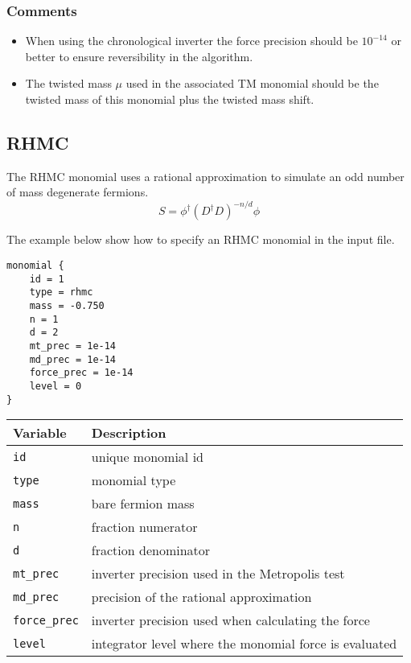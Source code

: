 \documentclass[12pt]{article}
\begin{document}
\subsubsection*{Comments}
\begin{itemize}
 \item When using the chronological inverter the force precision should be $10^{-14}$ or better to ensure reversibility in the algorithm.
 \item The twisted mass $\mu$ used in the associated TM monomial should be the twisted mass of this monomial plus the twisted mass shift.
\end{itemize}

\newpage
\subsection*{RHMC}
The RHMC monomial uses a rational approximation to simulate an odd number of mass degenerate fermions.
\begin{equation}
 S = \phi^\dagger(D^\dagger D)^{-n/d}\phi
\end{equation}

The example below show how to specify an RHMC monomial in the input file.
\begin{center}
\begin{minipage}{55mm}
\begin{framed}
\begin{verbatim}
monomial {
    id = 1
    type = rhmc
    mass = -0.750
    n = 1
    d = 2
    mt_prec = 1e-14
    md_prec = 1e-14
    force_prec = 1e-14
    level = 0
}
\end{verbatim}
\vspace{-5mm}
\end{framed}
\end{minipage}
\end{center}

\vspace{2mm}

\begin{center}
\begin{tabular}{l|l}
 Variable & Description \\
 \hline
 \verb|id|         & unique monomial id \\
 \verb|type|       & monomial type \\
 \verb|mass|       & bare fermion mass \\
 \verb|n|          & fraction numerator \\
 \verb|d|          & fraction denominator \\
 \verb|mt_prec|    & inverter precision used in the Metropolis test \\
 \verb|md_prec|    & precision of the rational approximation \\
 \verb|force_prec| & inverter precision used when calculating the force \\
 \verb|level|      & integrator level where the monomial force is evaluated
\end{tabular}
\end{center}
\end{document}
